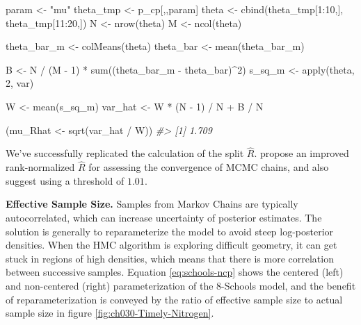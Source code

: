 \documentclass[11pt, oneside, openany]{scrbook}
\newenvironment{Shaded}{\begin{snugshade}}{\end{snugshade}}
\newcommand{\CommentTok}[1]{\textcolor[rgb]{0.56,0.35,0.01}{\textit{#1}}}
\newcommand{\DecValTok}[1]{\textcolor[rgb]{0.00,0.00,0.81}{#1}}
\newcommand{\FunctionTok}[1]{\textcolor[rgb]{0.00,0.00,0.00}{#1}}
\newcommand{\NormalTok}[1]{#1}
\newcommand{\OtherTok}[1]{\textcolor[rgb]{0.56,0.35,0.01}{#1}}
\newcommand{\SpecialCharTok}[1]{\textcolor[rgb]{0.00,0.00,0.00}{#1}}
\newcommand{\StringTok}[1]{\textcolor[rgb]{0.31,0.60,0.02}{#1}}
\begin{document}
\begin{Shaded}
\begin{Highlighting}[]
\NormalTok{param }\OtherTok{\textless{}{-}} \StringTok{"mu"}
\NormalTok{theta\_tmp }\OtherTok{\textless{}{-}}\NormalTok{ p\_cp[,,param]}
\NormalTok{theta }\OtherTok{\textless{}{-}} \FunctionTok{cbind}\NormalTok{(theta\_tmp[}\DecValTok{1}\SpecialCharTok{:}\DecValTok{10}\NormalTok{,], theta\_tmp[}\DecValTok{11}\SpecialCharTok{:}\DecValTok{20}\NormalTok{,])}
\NormalTok{N     }\OtherTok{\textless{}{-}} \FunctionTok{nrow}\NormalTok{(theta)}
\NormalTok{M     }\OtherTok{\textless{}{-}} \FunctionTok{ncol}\NormalTok{(theta)}

\NormalTok{theta\_bar\_m }\OtherTok{\textless{}{-}} \FunctionTok{colMeans}\NormalTok{(theta)}
\NormalTok{theta\_bar   }\OtherTok{\textless{}{-}} \FunctionTok{mean}\NormalTok{(theta\_bar\_m)}

\NormalTok{B }\OtherTok{\textless{}{-}}\NormalTok{ N }\SpecialCharTok{/}\NormalTok{ (M }\SpecialCharTok{{-}} \DecValTok{1}\NormalTok{) }\SpecialCharTok{*} \FunctionTok{sum}\NormalTok{((theta\_bar\_m }\SpecialCharTok{{-}}\NormalTok{ theta\_bar)}\SpecialCharTok{\^{}}\DecValTok{2}\NormalTok{)}
\NormalTok{s\_sq\_m }\OtherTok{\textless{}{-}} \FunctionTok{apply}\NormalTok{(theta, }\DecValTok{2}\NormalTok{, var)}

\NormalTok{W }\OtherTok{\textless{}{-}} \FunctionTok{mean}\NormalTok{(s\_sq\_m)}
\NormalTok{var\_hat }\OtherTok{\textless{}{-}}\NormalTok{ W }\SpecialCharTok{*}\NormalTok{ (N }\SpecialCharTok{{-}} \DecValTok{1}\NormalTok{) }\SpecialCharTok{/}\NormalTok{ N }\SpecialCharTok{+}\NormalTok{ B }\SpecialCharTok{/}\NormalTok{ N}

\NormalTok{(mu\_Rhat }\OtherTok{\textless{}{-}} \FunctionTok{sqrt}\NormalTok{(var\_hat }\SpecialCharTok{/}\NormalTok{ W))}
\CommentTok{\#\textgreater{} [1] 1.709}
\end{Highlighting}
\end{Shaded}


We've successfully replicated the calculation of the split \(\hat{R}\). \citet{vehtari2020rank} propose an improved rank-normalized \(\hat{R}\) for assessing the convergence of MCMC chains, and also suggest using a threshold of \(1.01\).

\textbf{Effective Sample Size.} Samples from Markov Chains are typically autocorrelated, which can increase uncertainty of posterior estimates. The solution is generally to reparameterize the model to avoid steep log-posterior densities. When the HMC algorithm is exploring difficult geometry, it can get stuck in regions of high densities, which means that there is more correlation between successive samples. Equation \eqref{eq:schools-ncp} shows the centered (left) and non-centered (right) parameterization of the 8-Schools model, and the benefit of reparameterization is conveyed by the ratio of effective sample size to actual sample size in figure \ref{fig:ch030-Timely-Nitrogen}.
\end{document}
